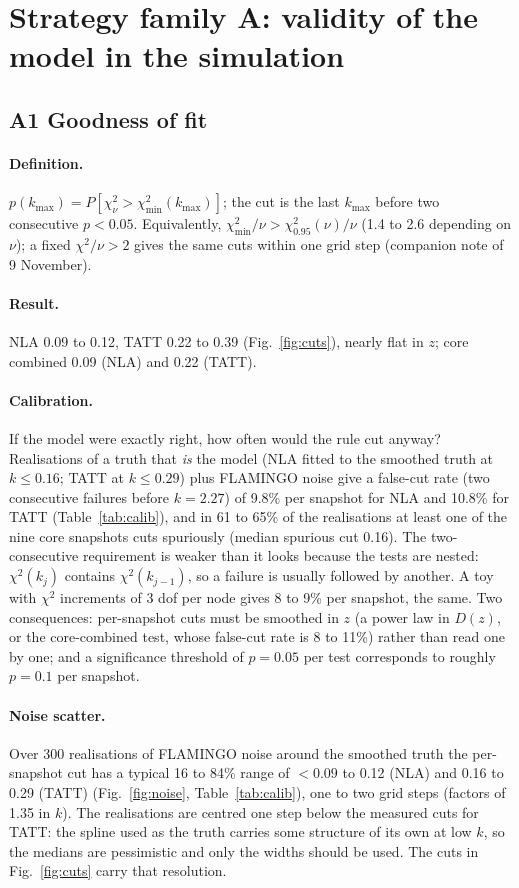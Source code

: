\documentclass[11pt]{article}
\newcommand{\kmax}{k_{\max}}
\begin{document}
\section{Strategy family A: validity of the model in the simulation}\label{sec:A}

\subsection{A1 Goodness of fit}\label{sec:gof}
\paragraph{Definition.} $p(\kmax) = P[\chi^2_\nu > \chi^2_{\min}(\kmax)]$;
the cut is the last $\kmax$ before two consecutive $p < 0.05$. Equivalently,
$\chi^2_{\min}/\nu > \chi^2_{0.95}(\nu)/\nu$ (1.4 to 2.6 depending on
$\nu$); a fixed $\chi^2/\nu > 2$ gives the same cuts within one grid step
(companion note of 9 November).

\paragraph{Result.} NLA 0.09 to 0.12, TATT 0.22 to 0.39 (Fig.~\ref{fig:cuts}),
nearly flat in $z$; core combined 0.09 (NLA) and 0.22 (TATT).

\paragraph{Calibration.} If the model were exactly right, how often would
the rule cut anyway? Realisations of a truth that \emph{is} the model (NLA
fitted to the smoothed truth at $k\le0.16$; TATT at $k\le0.29$) plus
FLAMINGO noise give a false-cut rate (two consecutive failures before
$k = 2.27$) of 9.8\% per snapshot for NLA and 10.8\% for TATT
(Table~\ref{tab:calib}), and in 61 to 65\% of the realisations at least one
of the nine core snapshots cuts spuriously (median spurious cut 0.16). The
two-consecutive requirement is weaker than it looks because the tests are
nested: $\chi^2(k_j)$ contains $\chi^2(k_{j-1})$, so a failure is usually
followed by another. A toy with $\chi^2$ increments of 3 dof per node gives
8 to 9\% per snapshot, the same. Two consequences: per-snapshot cuts must
be smoothed in $z$ (a power law in $D(z)$, or the core-combined test, whose
false-cut rate is 8 to 11\%) rather than read one by one; and a significance
threshold of $p = 0.05$ per test corresponds to roughly $p = 0.1$ per
snapshot.

\paragraph{Noise scatter.} Over 300 realisations of FLAMINGO noise around
the smoothed truth the per-snapshot cut has a typical 16 to 84\% range of
$<0.09$ to 0.12 (NLA) and 0.16 to 0.29 (TATT) (Fig.~\ref{fig:noise},
Table~\ref{tab:calib}), one to two grid steps (factors of 1.35 in $k$). The
realisations are centred one step below the measured cuts for TATT: the
spline used as the truth carries some structure of its own at low $k$, so
the medians are pessimistic and only the widths should be used. The cuts in
Fig.~\ref{fig:cuts} carry that resolution.
\end{document}
